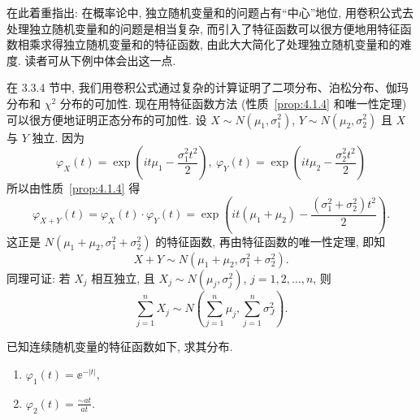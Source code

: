 在此着重指出: 在概率论中, 独立随机变量和的问题占有``中心''地位, 用卷积公式去处理独立随机变量和的问题是相当复杂, 而引入了特征函数可以很方便地用特征函数相乘求得独立随机变量和的特征函数, 由此大大简化了处理独立随机变量和的难度.
读者可从下例中体会出这一点.

\begin{example}\label{exam:4.1.4}
    在 3.3.4 节中, 我们用卷积公式通过复杂的计算证明了二项分布、泊松分布、伽玛分布和 $ \chi^2 $ 分布的可加性.
    现在用特征函数方法 (性质~\ref{prop:4.1.4} 和唯一性定理) 可以很方便地证明正态分布的可加性.
    设 $ X \sim N ( \mu_1, \sigma_1^2) $, $ Y \sim N ( \mu_2, \sigma_2^2) $ 且 $ X $ 与 $ Y $ 独立.
    因为
    \begin{equation*}
        \varphi_X (t) = \exp \left( it\mu_1 - \frac{\sigma_1^2 t^2}{2} \right), \ \varphi_Y (t) = \exp \left( it\mu_2 - \frac{\sigma_2^2 t^2}{2} \right)
    \end{equation*}
    所以由性质~\ref{prop:4.1.4} 得
    \begin{equation*}
        \varphi_{X+Y} (t) = \varphi_X (t) \cdot \varphi_Y (t) = \exp \left( it ( \mu_1 + \mu_2 ) - \frac{(\sigma_1^2 + \sigma_2^2) t^2}{2} \right).
    \end{equation*}
    这正是 $ N ( \mu_1 + \mu_2, \sigma_1^2 + \sigma_2^2 ) $ 的特征函数, 再由特征函数的唯一性定理, 即知
    \begin{equation*}
        X + Y \sim N ( \mu_1 + \mu_2, \sigma_1^2 + \sigma_2^2 ).
    \end{equation*}
    同理可证: 若 $ X_j $ 相互独立, 且 $ X_j \sim N ( \mu_j, \sigma_j^2 ) $, $ j = 1,2,\dotsc,n $, 则
    \begin{equation*}
        \sum_{j=1}^n X_j \sim N \left( \sum_{j=1}^n \mu_j, \sum_{j=1}^n \sigma_J^2 \right).
    \end{equation*}
\end{example}

\begin{example}
    已知连续随机变量的特征函数如下, 求其分布.
    \begin{enumerate}
        \item $ \varphi_1 (t) = \ee^{- \lvert t \rvert} $,
        \item $ \varphi_2 (t) = \frac{\sim at}{at} $.
    \end{enumerate}
\end{example}

